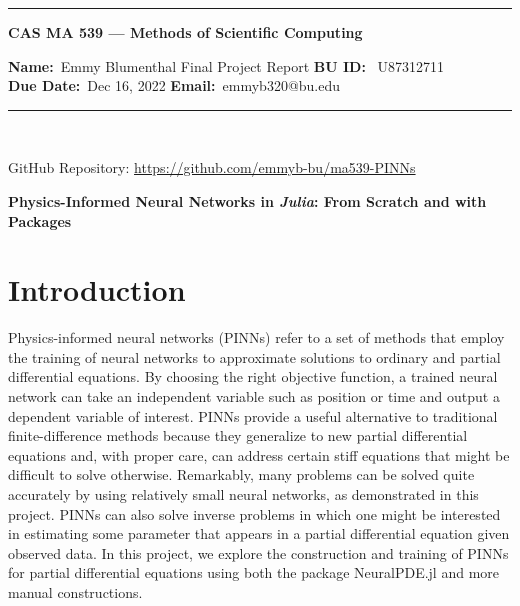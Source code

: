 \documentclass[11pt]{article}
\newcommand{\1}{\mathbf 1}
\begin{document}
{
	\begin{singlespace}
		
\begin{center}
	\hrule
	\vspace{.4cm}
	{\textbf { \large CAS MA 539 --- Methods of Scientific Computing}}
\end{center}
\textbf{Name:}\ Emmy Blumenthal \hspace{\fill} Final Project Report\hspace{\fill}  \textbf{BU ID:} \ U87312711 \\
\textbf{Due Date:}\  Dec 16, 2022   \hspace{\fill} \textbf{Email:}\ emmyb320@bu.edu \ 
\vspace{.4cm}
\hrule
\

GitHub Repository:  \url{https://github.com/emmyb-bu/ma539-PINNs}

\begin{center}
	\LARGE
	\bf
	Physics-Informed Neural Networks in {\em Julia}: From Scratch and with Packages
\end{center}

\tableofcontents

\end{singlespace}
}
\section{Introduction}

Physics-informed neural networks (PINNs) refer to a set of methods that employ the training of neural networks to approximate solutions to ordinary and partial differential equations.
By choosing the right objective function, a trained neural network can take an independent variable such as position or time and output a dependent variable of interest.
PINNs provide a useful alternative to traditional finite-difference methods because they generalize to new partial differential equations and, with proper care, can address certain stiff equations that might be difficult to solve otherwise.
Remarkably, many problems can be solved quite accurately by using relatively small neural networks, as demonstrated in this project.
PINNs can also solve inverse problems in which one might be interested in estimating some parameter that appears in a partial differential equation given observed data.
In this project, we explore the construction and training of PINNs for partial differential equations using both the package NeuralPDE.jl and more manual constructions.
\end{document}
